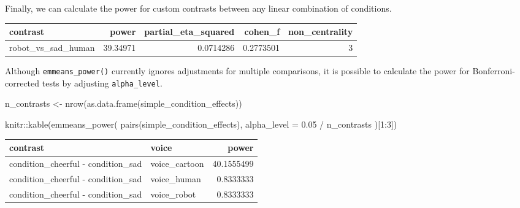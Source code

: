 \documentclass[
]{book}
\newenvironment{Shaded}{\begin{snugshade}}{\end{snugshade}}
\newcommand{\AttributeTok}[1]{\textcolor[rgb]{0.77,0.63,0.00}{#1}}
\newcommand{\DecValTok}[1]{\textcolor[rgb]{0.00,0.00,0.81}{#1}}
\newcommand{\FloatTok}[1]{\textcolor[rgb]{0.00,0.00,0.81}{#1}}
\newcommand{\FunctionTok}[1]{\textcolor[rgb]{0.00,0.00,0.00}{#1}}
\newcommand{\NormalTok}[1]{#1}
\newcommand{\OtherTok}[1]{\textcolor[rgb]{0.56,0.35,0.01}{#1}}
\newcommand{\SpecialCharTok}[1]{\textcolor[rgb]{0.00,0.00,0.00}{#1}}
\begin{document}
Finally, we can calculate the power for custom contrasts between any linear combination of conditions.

\begin{Shaded}
\end{Shaded}

\begin{tabular}{l|r|r|r|r}
\hline
contrast & power & partial\_eta\_squared & cohen\_f & non\_centrality\\
\hline
robot\_vs\_sad\_human & 39.34971 & 0.0714286 & 0.2773501 & 3\\
\hline
\end{tabular}

Although \texttt{emmeans\_power()} currently ignores adjustments for multiple comparisons, it is possible to calculate the power for Bonferroni-corrected tests by adjusting \texttt{alpha\_level}.

\begin{Shaded}
\begin{Highlighting}[]
\NormalTok{n\_contrasts }\OtherTok{\textless{}{-}} \FunctionTok{nrow}\NormalTok{(}\FunctionTok{as.data.frame}\NormalTok{(simple\_condition\_effects))}

\NormalTok{knitr}\SpecialCharTok{::}\FunctionTok{kable}\NormalTok{(}\FunctionTok{emmeans\_power}\NormalTok{(}
  \FunctionTok{pairs}\NormalTok{(simple\_condition\_effects),}
  \AttributeTok{alpha\_level =} \FloatTok{0.05} \SpecialCharTok{/}\NormalTok{ n\_contrasts}
\NormalTok{)[}\DecValTok{1}\SpecialCharTok{:}\DecValTok{3}\NormalTok{])}
\end{Highlighting}
\end{Shaded}

\begin{tabular}{l|l|r}
\hline
contrast & voice & power\\
\hline
condition\_cheerful - condition\_sad & voice\_cartoon & 40.1555499\\
\hline
condition\_cheerful - condition\_sad & voice\_human & 0.8333333\\
\hline
condition\_cheerful - condition\_sad & voice\_robot & 0.8333333\\
\hline
\end{tabular}
\end{document}
